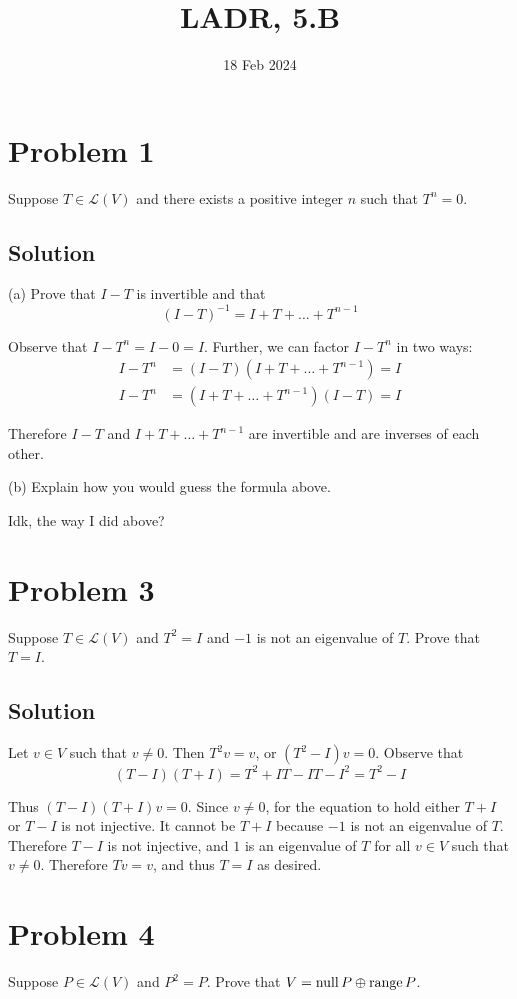 \documentclass{article}
\title{LADR, 5.B}
\date{18 Feb 2024}
\begin{document}
\maketitle

\section*{Problem 1}
Suppose $T\in\mathcal{L}(V)$ and there exists a positive integer $n$ such that $T^n=0$.

\subsection*{Solution}
(a) Prove that $I-T$ is invertible and that
\[(I-T)^{-1}=I+T+\ldots+T^{n-1}\]

Observe that $I-T^n=I-0=I$. Further, we can factor $I-T^n$ in two ways:
\begin{align*}
    I-T^n&=(I-T)(I+T+\ldots+T^{n-1})=I\\
    I-T^n&=(I+T+\ldots+T^{n-1})(I-T)=I
\end{align*}

Therefore $I-T$ and $I+T+\ldots+T^{n-1}$ are invertible and are inverses of each other.

\vs

(b) Explain how you would guess the formula above.

Idk, the way I did above?

\section*{Problem 3}
Suppose $T\in\mathcal{L}(V)$ and $T^2=I$ and $-1$ is not an eigenvalue of $T$. Prove that $T=I$.

\subsection*{Solution}
Let $v\in V$ such that $v\neq 0$. Then $T^2v=v$, or $(T^2-I)v=0$. Observe that
\[(T-I)(T+I)=T^2+IT-IT-I^2=T^2-I\]

Thus $(T-I)(T+I)v=0$. Since $v\neq 0$, for the equation to hold either $T+I$ or $T-I$ is not injective. It cannot be $T+I$ because $-1$ is not an eigenvalue of $T$. Therefore $T-I$ is not injective, and $1$ is an eigenvalue of $T$ for all $v\in V$ such that $v\neq 0$. Therefore $Tv=v$, and thus $T=I$ as desired.

\section*{Problem 4}
Suppose $P\in\mathcal{L}(V)$ and $P^2=P$. Prove that $V=\text{null}\, P\oplus \text{range}\, P$.
\end{document}
